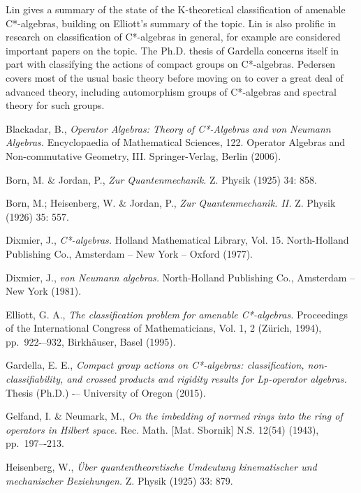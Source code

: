 \documentclass[12pt,a4paper]{amsart}
\theoremstyle{plain}
\theoremstyle{definition}
\begin{document}
	
	Lin \cite{lin01} gives a summary of the state of the K-theoretical classification of amenable C*-algebras, building on Elliott's summary \cite{elliott94} of the topic. 
	Lin is also prolific in research on classification of C*-algebras in general, for example \cite{lin08,lin11} are considered important papers on the topic.
	The Ph.D. thesis of Gardella \cite{gardella15} concerns itself in part with classifying the actions of compact groups on C*-algebras.
	Pedersen \cite{pedersen79} covers most of the usual basic theory before moving on to cover a great deal of advanced theory, including automorphism groups of C*-algebras and spectral theory for such groups.
	


\begin{thebibliography}{00}
	Blackadar, B.,
	\emph{Operator Algebras: Theory of C*-Algebras and von Neumann Algebras.}
	Encyclopaedia of Mathematical Sciences, 122. Operator Algebras and Non-commutative Geometry, III. Springer-Verlag, Berlin (2006).
	
	Born, M. \& Jordan, P.,
	\emph{Zur Quantenmechanik.}
	Z. Physik (1925) 34: 858.
	
	Born, M.; Heisenberg, W. \& Jordan, P.,
	\emph{Zur Quantenmechanik. II.}
	Z. Physik (1926) 35: 557.

	Dixmier, J.,
	\emph{C*-algebras.}
	Holland Mathematical Library, Vol. 15. North-Holland Publishing Co., Amsterdam -- New York -- Oxford (1977).

	Dixmier, J.,
	\emph{von Neumann algebras.}
	North-Holland Publishing Co., Amsterdam -- New York (1981).
		
	Elliott, G. A.,
	\emph{The classification problem for amenable C*-algebras.}
	Proceedings of the International Congress of Mathematicians, Vol. 1, 2 (Z\"{u}rich, 1994), pp.~922-–932, Birkhäuser, Basel (1995).

	Gardella, E. E.,
	\emph{Compact group actions on C*-algebras: classification, non-classifiability, and crossed products and rigidity results for Lp-operator algebras. }
	Thesis (Ph.D.) -– University of Oregon (2015).

	Gelfand, I. \& Neumark, M.,
	\emph{On the imbedding of normed rings into the ring of operators in Hilbert space.}
	Rec. Math. [Mat. Sbornik] N.S. 12(54) (1943), pp.~197–-213.

	Heisenberg, W.,
	\emph{{\"U}ber quantentheoretische Umdeutung kinematischer und mechanischer Beziehungen.}
	Z. Physik (1925) 33: 879. 
	

\end{thebibliography}
\end{document}
